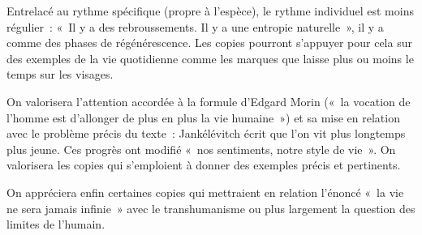 {Entrelacé au rythme spécifique (propre à l'espèce), le rythme individuel est moins
régulier~: «~Il y a des rebroussements. Il y a une entropie naturelle~», il y a comme des
phases de régénérescence. Les copies pourront s'appuyer pour cela sur des
exemples de la vie quotidienne comme les marques que laisse plus ou moins le temps
sur les visages.

On valorisera l'attention accordée à la formule d'Edgard Morin («~la vocation de
l'homme est d'allonger de plus en plus la vie humaine~») et sa mise en relation avec le
problème précis du texte~: Jankélévitch écrit que l'on vit plus longtemps plus jeune.
Ces progrès ont modifié «~nos sentiments, notre style de vie~». On valorisera les copies
qui s'emploient à donner des exemples précis et pertinents.

On appréciera enfin certaines copies qui mettraient en relation l'énoncé «~la vie
ne sera jamais infinie~» avec le transhumanisme ou plus largement la question des
limites de l'humain.
}%
